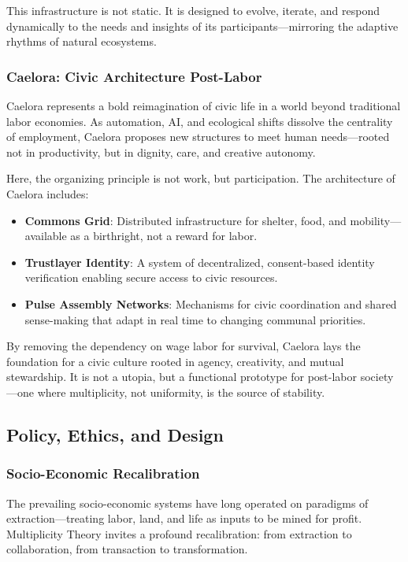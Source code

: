 \documentclass{article}
\theoremstyle{plain}
\theoremstyle{claimstyle}
\begin{document}
This infrastructure is not static. It is designed to evolve, iterate, and respond dynamically to the needs and insights of its participants—mirroring the adaptive rhythms of natural ecosystems.

\subsubsection{Caelora: Civic Architecture Post-Labor}

Caelora represents a bold reimagination of civic life in a world beyond traditional labor economies. As automation, AI, and ecological shifts dissolve the centrality of employment, Caelora proposes new structures to meet human needs—rooted not in productivity, but in dignity, care, and creative autonomy.

Here, the organizing principle is not work, but participation. The architecture of Caelora includes:

\begin{itemize}
    \item \textbf{Commons Grid}: Distributed infrastructure for shelter, food, and mobility—available as a birthright, not a reward for labor.
    \item \textbf{Trustlayer Identity}: A system of decentralized, consent-based identity verification enabling secure access to civic resources.
    \item \textbf{Pulse Assembly Networks}: Mechanisms for civic coordination and shared sense-making that adapt in real time to changing communal priorities.
\end{itemize}

By removing the dependency on wage labor for survival, Caelora lays the foundation for a civic culture rooted in agency, creativity, and mutual stewardship. It is not a utopia, but a functional prototype for post-labor society—one where multiplicity, not uniformity, is the source of stability.

\subsection{Policy, Ethics, and Design}

\subsubsection{Socio-Economic Recalibration}

The prevailing socio-economic systems have long operated on paradigms of extraction—treating labor, land, and life as inputs to be mined for profit. Multiplicity Theory invites a profound recalibration: from extraction to collaboration, from transaction to transformation.
\end{document}
